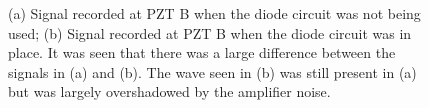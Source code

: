 \begin{figure}[ht!]
\begin{subfigmatrix}{2}
\end{subfigmatrix}

  \caption
  { \label{fig:diodeCircuitResults}
(a) Signal recorded at PZT B when the diode circuit was not being used;
(b) Signal recorded at PZT B when the diode circuit was in place. It was seen that there was a large difference between the signals in (a) and (b). The wave seen in (b) was still present in (a) but was largely overshadowed by the amplifier noise.
}
\end{figure}


